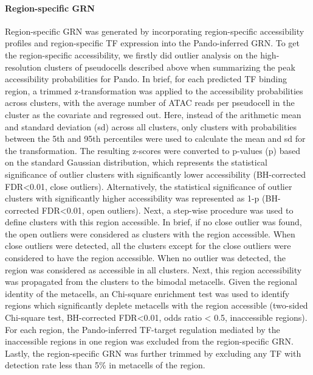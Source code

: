 \paragraph{Region-specific GRN}
Region-specific GRN was generated by incorporating region-specific accessibility profiles and region-specific TF expression into the Pando-inferred GRN. To get the region-specific accessibility, we firstly did outlier analysis on the high-resolution clusters of pseudocells described above when summarizing the peak accessibility probabilities for Pando. In brief, for each predicted TF binding region, a trimmed z-transformation was applied to the accessibility probabilities across clusters, with the average number of ATAC reads per pseudocell in the cluster as the covariate and regressed out. Here, instead of the arithmetic mean and standard deviation (sd) across all clusters, only clusters with probabilities between the 5th and 95th percentiles were used to calculate the mean and sd for the transformation. The resulting z-scores were converted to p-values (p) based on the standard Gaussian distribution, which represents the statistical significance of outlier clusters with significantly lower accessibility (BH-corrected FDR<0.01, close outliers). Alternatively, the statistical significance of outlier clusters with significantly higher accessibility was represented as 1-p (BH-corrected FDR<0.01, open outliers). Next, a step-wise procedure was used to define clusters with this region accessible. In brief, if no close outlier was found, the open outliers were considered as clusters with the region accessible. When close outliers were detected, all the clusters except for the close outliers were considered to have the region accessible. When no outlier was detected, the region was considered as accessible in all clusters. Next, this region accessibility was propagated from the clusters to the bimodal metacells. Given the regional identity of the metacells, an Chi-square enrichment test was used to identify regions which significantly deplete metacells with the region accessible (two-sided Chi-square test, BH-corrected FDR<0.01, odds ratio < 0.5, inaccessible regions). For each region, the Pando-inferred TF-target regulation mediated by the inaccessible regions in one region was excluded from the region-specific GRN. Lastly, the region-specific GRN was further trimmed by excluding any TF with detection rate less than 5\% in metacells of the region.
 
